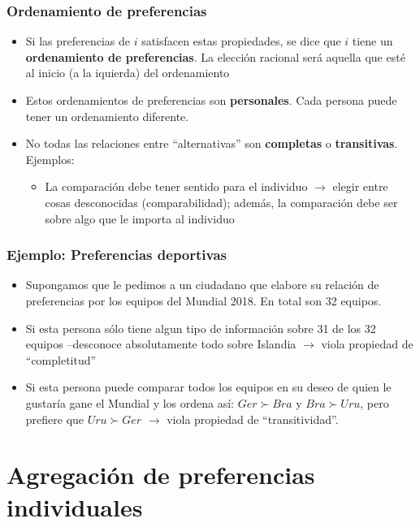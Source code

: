 \documentclass[14pt,aspectratio=169]{beamer}
\begin{document}
\begin{frame}\frametitle{Ordenamiento de preferencias}
\begin{itemize}
\item Si las preferencias de $i$ satisfacen estas propiedades, se dice
  que $i$ tiene un \textbf{ordenamiento de preferencias}. La elección
  racional será aquella que esté al inicio (a la iquierda) del
  ordenamiento
\item Estos ordenamientos de preferencias son
  \textbf{personales}. Cada persona puede tener un ordenamiento
  diferente. 
\item No todas las relaciones entre ``alternativas'' son
  \textbf{completas} o \textbf{transitivas}. Ejemplos:
\begin{itemize}\itemsep 5pt \smallskip
\item La comparación debe tener sentido para el individuo
  $\longrightarrow$ elegir entre cosas desconocidas (comparabilidad);
  además, la comparación debe ser sobre algo que le importa al individuo
\end{itemize}
\end{itemize}
\end{frame}


\begin{frame}\frametitle{Ejemplo: Preferencias deportivas}
\begin{itemize}
\item Supongamos que le pedimos a un ciudadano que elabore su relación de
  preferencias por los equipos del Mundial 2018. En total son 32
  equipos. 
\item Si esta persona sólo tiene algun tipo de información sobre 31 de
  los 32 equipos --desconoce absolutamente todo sobre Islandia
  $\longrightarrow$ viola propiedad de ``completitud''
  \item Si esta persona puede comparar todos los equipos en su
    deseo de quien le gustaría gane el Mundial y los ordena así: $Ger
    \succ Bra$ y $Bra \succ Uru$, pero prefiere que $Uru \succ Ger$
    $\longrightarrow$ viola propiedad de ``transitividad''. 
\end{itemize}
\end{frame}

\section{Agregación de preferencias individuales}
\end{document}
